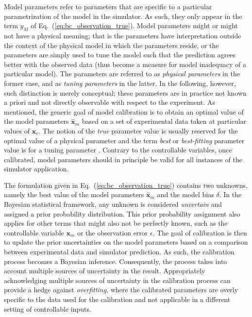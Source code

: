 Model parameters refer to parameters that are specific to a particular parametrization of the model in the simulator.
As such, they only appear in the term $y_M$ of Eq.~(\ref{eq:bc_observation_true}).
Model parameters might or might not have a physical meaning;
that is the parameters have interpretation outside the context of the physical model in which the parameters reside, or  the parameters are simply used to tune the model such that the prediction agrees better with the observed data (thus become a measure for model inadequacy of a particular model).
The parameters are referred to as \emph{physical parameters} in the former case,
and as \emph{tuning parameters} in the latter.
In the following, however, such distinction is merely conceptual;
these parameters are in practice not known a priori and not directly observable with respect to the experiment.
As mentioned, the generic goal of model calibration is to obtain an optimal value of the model parameters $\hat{\bm{x}}_m$ based on a set of experimental data taken at particular values of $\bm{x}_c$.
The notion of the \emph{true} parameter value is usually reserved for the optimal value of a physical parameter \cite{OHagan2013} and the term \emph{best} or \emph{best-fitting} parameter value is for a tuning parameter \cite{Bayarri2007}.
Contrary to the controllable variables, once calibrated, model parameters should in principle be valid for all instances of the simulator application.

The formulation given in Eq.~(\ref{eq:bc_observation_true}) contains two unknowns, namely the best value of the model parameters $\hat{\bm{x}}_m$ and the model bias $\delta$.
In the Bayesian statistical framework, any unknown is considered \emph{uncertain} and assigned a prior probability distribution.
This prior probability assignment also applies for other terms that might also not be perfectly known, such as the controllable variable $\bm{x}_m$ or the observation error $\epsilon$. 
The goal of calibration is then to update the prior uncertainties on the model parameters based on a comparison between experimental data and simulator prediction.
As such, the calibration process becomes a Bayesian inference.
Consequently, the process takes into account multiple sources of uncertainty in the result.
Appropriately acknowledging multiple sources of uncertainty in the calibration process can provide a hedge against \emph{overfitting}, where the calibrated parameters are overly specific to the data used for the calibration and not applicable in a different setting of controllable inputs.

